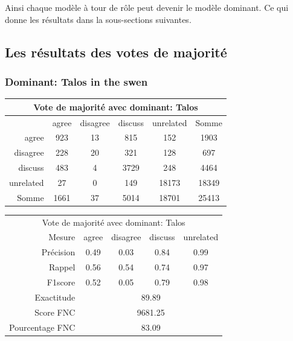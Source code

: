 \documentclass[11pt,a4paper,oldfontcommands]{memoir}
\begin{document}
Ainsi chaque modèle à tour de rôle peut devenir le modèle dominant.
Ce qui donne les résultats dans la sous-sections suivantes.

\subsection{Les résultats des votes de majorité}
\subsubsection{Dominant: Talos in the swen}

\begin{center}
 \begin{tabular}{ r | c c c c | c }
  \multicolumn{6}{c}{Vote de majorité avec dominant: Talos}  \\
  \hline
            & agree & disagree & discuss & unrelated & Somme \\
  \hline
  agree     & 923   & 13       & 815     & 152       & 1903  \\
  disagree  & 228   & 20       & 321     & 128       & 697   \\
  discuss   & 483   & 4        & 3729    & 248       & 4464  \\
  unrelated & 27    & 0        & 149     & 18173     & 18349 \\
  \hline
  Somme     & 1661  & 37       & 5014    & 18701     & 25413 \\
 \end{tabular}
\end{center}


\begin{center}
 \begin{tabular}{ r | c c c c }
  \multicolumn{5}{c}{Vote de majorité avec dominant: Talos}                      \\
  Mesure          & agree                       & disagree & discuss & unrelated \\
  \hline
  Précision       & 0.49                        & 0.03     & 0.84    & 0.99      \\
  Rappel          & 0.56                        & 0.54     & 0.74    & 0.97      \\
  F1score         & 0.52                        & 0.05     & 0.79    & 0.98      \\
  \hline
  \hline
  Exactitude      & \multicolumn{4}{c}{89.89}                                    \\
  Score FNC       & \multicolumn{4}{c}{9681.25}                                  \\
  Pourcentage FNC & \multicolumn{4}{c}{83.09}                                    \\
 \end{tabular}
\end{center}
\end{document}
